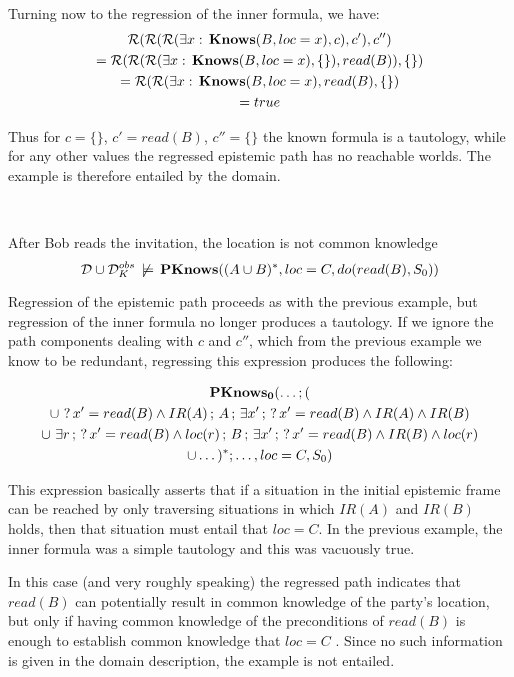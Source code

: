 Turning now to the regression of the inner formula, we have:\begin{gather*}
\mathcal{R}(\mathcal{R}(\mathcal{R}(\exists x:\,\mathbf{Knows}(B,loc=x),c),c'),c'')\\
=\mathcal{R}(\mathcal{R}(\mathcal{R}(\exists x:\,\mathbf{Knows}(B,loc=x),\{\}),read(B)),\{\})\\
=\mathcal{R}(\mathcal{R}(\exists x:\,\mathbf{Knows}(B,loc=x),read(B),\{\})\\
=true\end{gather*}


Thus for $c=\{\}$, $c'=read(B)$, $c''=\{\}$ the known formula is
a tautology, while for any other values the regressed epistemic path
has no reachable worlds. The example is therefore entailed by the
domain.

~

\begin{example}
After Bob reads the invitation, the location is not common knowledge\[
\mathcal{D}\cup\mathcal{D}_{K}^{obs}\,\not\models\,\mathbf{PKnows}((A\cup B)^{*},loc=C,do(read(B),S_{0}))\]

\end{example}
Regression of the epistemic path proceeds as with the previous example,
but regression of the inner formula no longer produces a tautology.
If we ignore the path components dealing with $c$ and $c''$, which
from the previous example we know to be redundant, regressing this
expression produces the following:

\begin{multline*}
\mathbf{PKnows_{0}}(\dots;(\\
\cup\,\,?\, x'=read(B)\wedge IR(A)\,;\, A\,;\,\exists x'\,;\,?\, x'=read(B)\wedge IR(A)\wedge IR(B)\\
\cup\,\,\exists r\,;\,?\, x'=read(B)\wedge loc(r)\,;\, B\,;\,\exists x'\,;\,?\, x'=read(B)\wedge IR(B)\wedge loc(r)\\
\cup\dots)^{*};\dots,loc=C,S_{0})\end{multline*}


This expression basically asserts that if a situation in the initial
epistemic frame can be reached by only traversing situations in which
$IR(A)$ and $IR(B)$ holds, then that situation must entail that
$loc=C$. In the previous example, the inner formula was a simple
tautology and this was vacuously true.

In this case (and very roughly speaking) the regressed path indicates
that $read(B)$ can potentially result in common knowledge of the
party's location, but only if having common knowledge of the preconditions
of $read(B)$ is enough to establish common knowledge that $loc=C$
. Since no such information is given in the domain description, the
example is not entailed.

